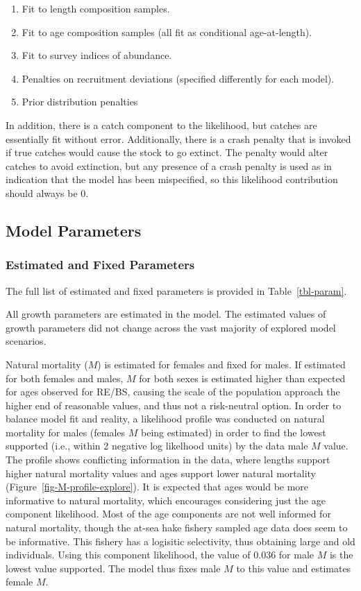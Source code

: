\documentclass[
]{scrartcl}
\providecommand{\tightlist}{%
  \setlength{\itemsep}{0pt}\setlength{\parskip}{0pt}}\usepackage{longtable,booktabs,array}
\begin{document}
\begin{enumerate}
\def\labelenumi{\arabic{enumi}.}
\tightlist
\item
  Fit to length composition samples.
\item
  Fit to age composition samples (all fit as conditional age-at-length).
\item
  Fit to survey indices of abundance.
\item
  Penalties on recruitment deviations (specified differently for each
  model).
\item
  Prior distribution penalties
\end{enumerate}

In addition, there is a catch component to the likelihood, but catches
are essentially fit without error. Additionally, there is a crash
penalty that is invoked if true catches would cause the stock to go
extinct. The penalty would alter catches to avoid extinction, but any
presence of a crash penalty is used as in indication that the model has
been mispecified, so this likelihood contribution should always be 0.

\subsection{Model Parameters}\label{model-parameters}

\subsubsection{Estimated and Fixed
Parameters}\label{estimated-and-fixed-parameters}

The full list of estimated and fixed parameters is provided in
Table~\ref{tbl-param}.

All growth parameters are estimated in the model. The estimated values
of growth parameters did not change across the vast majority of explored
model scenarios.

Natural mortality (\(M\)) is estimated for females and fixed for males.
If estimated for both females and males, \(M\) for both sexes is
estimated higher than expected for ages observed for RE/BS, causing the
scale of the population approach the higher end of reasonable values,
and thus not a risk-neutral option. In order to balance model fit and
reality, a likelihood profile was conducted on natural mortality for
males (females \(M\) being estimated) in order to find the lowest
supported (i.e., within 2 negative log likelhood units) by the data male
\(M\) value. The profile shows conflicting information in the data,
where lengths support higher natural mortality values and ages support
lower natural mortality (Figure~\ref{fig-M-profile-explore}). It is
expected that ages would be more informative to natural mortality, which
encourages considering just the age component likelihood. Most of the
age components are not well informed for natural mortality, though the
at-sea hake fishery sampled age data does seem to be informative. This
fishery has a logisitic selectivity, thus obtaining large and old
individuals. Using this component likelihood, the value of 0.036 for
male \(M\) is the lowest value supported. The model thus fixes male
\(M\) to this value and estimates female \(M\).
\end{document}
